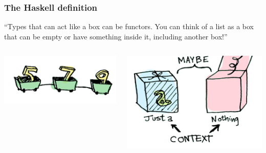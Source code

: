 \documentclass[12pt, xcolor=table]{beamer}
\begin{document}
\begin{frame}
    \frametitle{The Haskell definition}
    ``Types that can act like a box can be functors. You can think of a list as a box that can be empty or have something inside it, including another box!''
    \vspace{30px}
    \begin{columns}
            \begin{center}
            \includegraphics[scale=0.4]{figures/list.png}
            \end{center}
            \begin{center}
            \includegraphics[scale=0.4]{figures/maybe.png}
            \end{center}
    \end{columns}
\end{frame}
\end{document}
